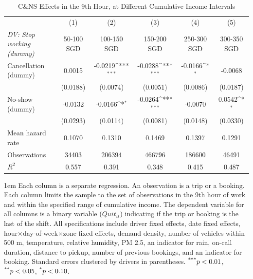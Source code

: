 \documentclass[reviewmode]{restat}
\begin{document}
\begin{table}[]
	\centering
	\caption{C\&NS Effects in the 9th Hour, at Different Cumulative Income Intervals}
	\label{tb:quitincome}
    {
    \footnotesize
    \def\sym#1{\ifmmode^{#1}\else\(^{#1}\)\fi}
	\begin{tabularx}{\textwidth}{l@{\extracolsep{\fill}}*{5}{c}}
        \toprule
        \toprule
                    &\multicolumn{1}{c}{(1)}&\multicolumn{1}{c}{(2)}&\multicolumn{1}{c}{(3)}&\multicolumn{1}{c}{(4)}&\multicolumn{1}{c}{(5)}\\
                    \multicolumn{1}{l}{\textit{DV: Stop working (dummy)}}&\multicolumn{1}{c}{50-100 SGD}&\multicolumn{1}{c}{100-150 SGD}&\multicolumn{1}{c}{150-200 SGD}&\multicolumn{1}{c}{250-300 SGD}&\multicolumn{1}{c}{300-350 SGD}\\
        \midrule
        Cancellation (dummy)&      0.0015&     -0.0219\sym{***}&     -0.0288\sym{***}&     -0.0166\sym{*}&     -0.0068\\
                    &    (0.0188)&    (0.0074)&    (0.0051)&    (0.0086)&    (0.0187)\\
        \addlinespace
        No-show (dummy)&     -0.0132&     -0.0166\sym{*}&     -0.0264\sym{***}&     -0.0070&      0.0542\sym{*}\\
                    &    (0.0293)&    (0.0114)&    (0.0081)&    (0.0148)&    (0.0330)\\
        \midrule
        Mean hazard rate&      0.1070&      0.1310&      0.1469&      0.1397&      0.1291\\
        Observations& \num{34403}&\num{206394}&\num{466796}&\num{186600}& \num{46491}\\
        \(R^2\)     &       0.557&       0.391&       0.348&       0.415&       0.487\\
        \bottomrule
    \end{tabularx}
    }
    \begin{tablenotes}
    	\parindent 1em%
		\small
		Each column is a separate regression. An observation is a trip or a booking. Each column limits the sample to the set of observations in the 9th hour of work and within the specified range of cumulative income. The dependent variable for all columns is a binary variable ($Quit_{it}$) indicating if the trip or booking is the last of the shift. All specifications include driver fixed effects, date fixed effects, hour$\times$day-of-week$\times$zone fixed effects, demand density, number of vehicles within 500 m, temperature, relative humidity, PM 2.5, an indicator for rain, on-call duration, distance to pickup, number of previous bookings, and an indicator for booking. Standard errors clustered by drivers in parentheses. $\textsuperscript{***}p < 0.01$, $\textsuperscript{**}p < 0.05$, $\textsuperscript{*}p < 0.10$.  
    \end{tablenotes}

\end{table}
\end{document}
